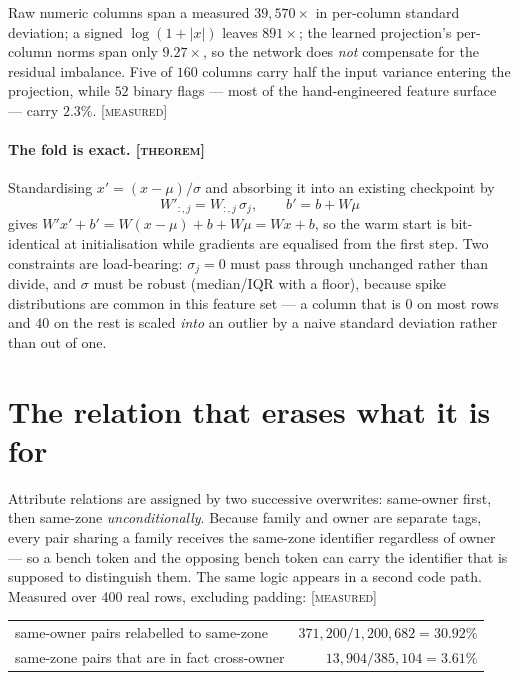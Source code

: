 \documentclass[11pt,a4paper]{article}
\newcommand{\tagM}{\textcolor{cV2}{\textsc{[measured]}}}
\newcommand{\tagT}{\textsc{[theorem]}}
\begin{document}
Raw numeric columns span a measured $39{,}570\times$ in per-column standard
deviation; a signed $\log(1+|x|)$ leaves $891\times$; the learned projection's
per-column norms span only $9.27\times$, so the network does \emph{not}
compensate for the residual imbalance. Five of $160$ columns carry half the
input variance entering the projection, while $52$ binary flags --- most of the
hand-engineered feature surface --- carry $2.3\%$. \tagM

\paragraph{The fold is exact. \tagT}
Standardising $x' = (x-\mu)/\sigma$ and absorbing it into an existing checkpoint by
\[
W'_{:,j} = W_{:,j}\,\sigma_j, \qquad b' = b + W\mu
\]
gives $W'x' + b' = W(x-\mu) + b + W\mu = Wx + b$, so the warm start is
bit-identical at initialisation while gradients are equalised from the first
step. Two constraints are load-bearing: $\sigma_j = 0$ must pass through
unchanged rather than divide, and $\sigma$ must be robust (median/IQR with a
floor), because spike distributions are common in this feature set --- a column
that is $0$ on most rows and $40$ on the rest is scaled \emph{into} an outlier by
a naive standard deviation rather than out of one.

\section{The relation that erases what it is for}
\label{sec:reldefect}

Attribute relations are assigned by two successive overwrites: same-owner first,
then same-zone \emph{unconditionally}. Because family and owner are separate
tags, every pair sharing a family receives the same-zone identifier regardless of
owner --- so a bench token and the opposing bench token can carry the identifier
that is supposed to distinguish them. The same logic appears in a second code
path. Measured over 400 real rows, excluding padding: \tagM

\begin{center}
\begin{tabular}{lr}
\toprule
same-owner pairs relabelled to same-zone & $371{,}200/1{,}200{,}682 = 30.92\%$ \\
same-zone pairs that are in fact cross-owner & $13{,}904/385{,}104 = 3.61\%$ \\
\bottomrule
\end{tabular}
\end{center}
\end{document}
